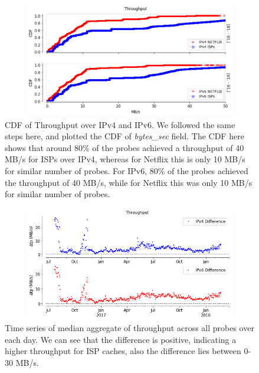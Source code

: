 \begin{figure}[!ht]
	\centering
	\includegraphics[keepaspectratio, height=5cm, width=15cm]{figures/cache/allisps/netlflix-throughput-difference-all-isps-separate.pdf}
	\caption[All ISPs Throughput CDF Absolute]{CDF of Throughput over IPv4 and IPv6. We followed the same steps here, and plotted the CDF of \textit{bytes\_sec} field. The CDF here shows that around 80\% of the probes achieved a throughput of 40 MB/s for ISPs over IPv4, whereas for Netflix this is only 10 MB/s
for similar number of probes. For IPv6, 80\% of the probes achieved the throughput of 40 MB/s, while for Netflix this was only 10 MB/s for similar number of probes.}
	\label{fig:All ISPs Throughput CDF Absolute}
\end{figure}

\FloatBarrier

\begin{figure}[!ht]
	\centering
	\includegraphics[keepaspectratio, height=5cm, width=15cm]{figures/cache/allisps/netflix-throughput-timeseries-all-isps.png}
	\caption[All ISPs Throughput Timeseries Deltas]{Time series of median aggregate of throughput across all probes over each day.
We can see that the difference is positive, indicating a higher throughput for ISP caches, also the difference lies between 0-30 MB/s.}
	\label{fig:All ISPs Throughput Timeseries Deltas}
\end{figure}


